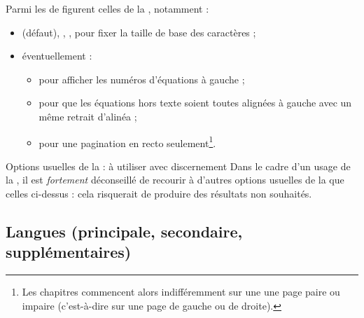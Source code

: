 Parmi les  de \yatcl figurent celles de la ,
notamment :
\begin{itemize}
\item{}%
  \docAuxKey{10pt} (défaut), \docAuxKey{11pt}, \docAuxKey{12pt}, pour fixer
  la taille de base des caractères ;
\item éventuellement :
  \begin{itemize}
  \item{}%
     pour afficher les numéros d'équations à gauche ;
  \item{}%
     pour que les équations hors texte soient toutes
    alignées à gauche avec un même retrait d'alinéa ;
  \item%
     pour une pagination en recto seulement\footnote{Les
      chapitres commencent alors indifféremment sur une une page paire ou
      impaire (c'est-à-dire sur une page de gauche ou
      de droite).}.
  \end{itemize}
\end{itemize}
\begin{dbwarning}{Options usuelles de la  : à utiliser avec
    discernement}{}
  Dans le cadre d'un usage de la \yatCl, il est \emph{fortement} déconseillé de
  recourir à d'autres options usuelles de la  que celles
  ci-dessus : cela risquerait de produire des résultats non souhaités.
\end{dbwarning}

%

\subsection{Langues (principale, secondaire, supplémentaires)}
\label{sec-langues}%
%
%
%
%
%

